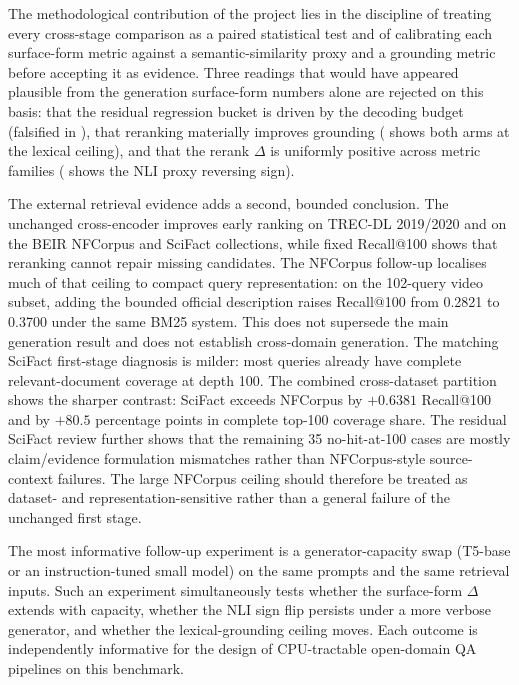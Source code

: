 \documentclass[11pt,a4paper]{article}
\makeatletter
\newcommand{\recallH}{Recall@100}
\newcommand{\bmtwofive}{BM25}
\makeatother
\begin{document}
The methodological contribution of the project lies in the
discipline of treating every cross-stage comparison as a paired
statistical test and of calibrating each surface-form metric
against a semantic-similarity proxy and a grounding metric before
accepting it as evidence.  Three readings that would have appeared
plausible from the generation surface-form numbers alone are rejected on
this basis: that the residual regression bucket is driven by the
decoding budget (falsified in ), that
reranking materially improves grounding (
shows both arms at the lexical ceiling), and that the rerank
$\Delta$ is uniformly positive across metric families
( shows the NLI proxy reversing sign).

The external retrieval evidence adds a second, bounded conclusion.
The unchanged cross-encoder improves early ranking on TREC-DL 2019/2020
and on the BEIR NFCorpus and SciFact collections, while fixed
Recall@100 shows that reranking cannot repair missing candidates.  The
NFCorpus follow-up localises much of that ceiling to compact query
representation: on the 102-query video subset, adding the bounded
official description raises \recallH{} from 0.2821 to 0.3700 under the
same \bmtwofive{} system.  This does not supersede the main generation
result and does not establish cross-domain generation.  The matching
SciFact first-stage diagnosis is milder: most queries already have
complete relevant-document coverage at depth 100.  The combined
cross-dataset partition shows the sharper contrast: SciFact exceeds
NFCorpus by $+0.6381$ \recallH{} and by $+80.5$ percentage points in
complete top-100 coverage share.  The residual SciFact review further
shows that the remaining 35 no-hit-at-100 cases are mostly
claim/evidence formulation mismatches rather than NFCorpus-style
source-context failures.  The large NFCorpus ceiling should therefore
be treated as dataset- and representation-sensitive rather than a
general failure of the unchanged first stage.

The most informative follow-up experiment is a generator-capacity
swap (T5-base or an instruction-tuned small model) on the same
prompts and the same retrieval inputs.  Such an experiment
simultaneously tests whether the surface-form $\Delta$ extends
with capacity, whether the NLI sign flip persists under a more
verbose generator, and whether the lexical-grounding ceiling
moves.  Each outcome is independently informative for the design
of CPU-tractable open-domain QA pipelines on this benchmark.
\end{document}
